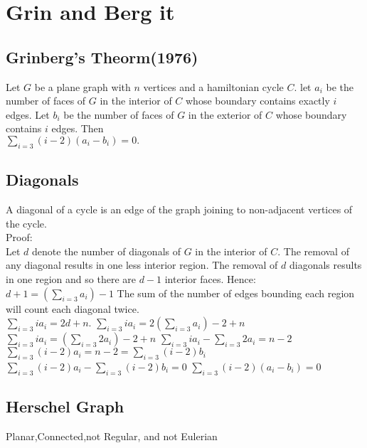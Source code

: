 \chapter{Grin and Berg it}

\section{Grinberg's Theorm(1976)}
Let $G$ be a plane graph with $n$ vertices and a hamiltonian cycle $C$. let $a_i$ be the number of faces of $G$ in the interior of $C$ whose boundary contains exactly $i$ edges. Let $b_i$ be the number of faces of $G$ in the exterior of $C$ whose boundary contains $i$ edges. Then\\[.25in] $\sum_{i=3}(i-2)(a_i-b_i)=0.$\\[.25in]

\section{Diagonals}
A diagonal of a cycle is an edge of the graph joining to non-adjacent vertices of the cycle.\\[.25in]
{Proof:}\\[.25in]
Let $d$ denote the number of diagonals of $G$ in the interior of $C$. The removal of any diagonal results in one less interior region. The removal of $d$ diagonals results in one region and so there are $d-1$ interior faces. Hence:\newline 
$d+1 = (\sum_{i=3}a_i)-1$\newline
The sum of the number of edges bounding each region will count each diagonal twice.\\[.25in]
$\sum_{i=3}ia_i = 2d+n.$\newline
$\sum_{i=3}ia_i = 2(\sum_{i=3}a_i)-2+n$\newline
$\sum_{i=3}ia_i = (\sum_{i=3}2a_i)-2+n$\newline
$\sum_{i=3}ia_i - \sum_{i=3}2a_i = n-2$\newline
$\sum_{i=3}(i-2)a_i = n - 2 = \sum_{i=3}(i-2)b_i$\newline
$\sum_{i=3}(i-2)a_i - \sum_{i=3}(i-2)b_i=0$\newline
$\sum_{i=3}(i-2)(a_i-b_i)=0$

\section{Herschel Graph}

Planar,Connected,not Regular, and not Eulerian


